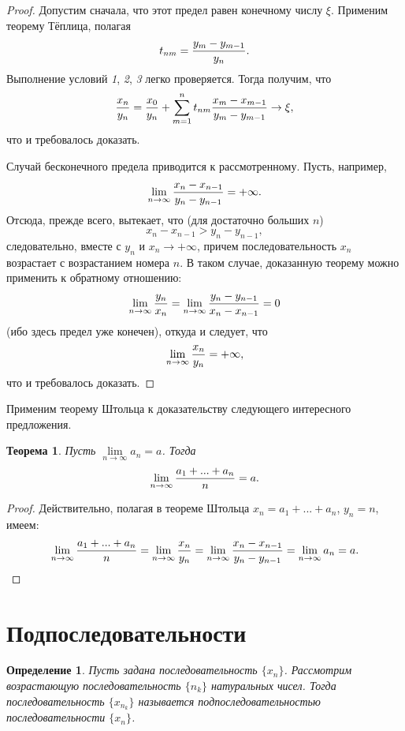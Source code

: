 \documentclass{article}
\newtheorem{theorem}{Теорема}[section]
\newtheorem{definition}{Определение}[section]
\begin{document}
\begin{proof}
Допустим сначала, что этот предел равен конечному числу \(\xi\). Применим теорему Тёплица, полагая
\[
t_{nm} = {{y_m - y_{m - 1}}\over y_n}.
\]
Выполнение условий \textit{1}, \textit{2}, \textit{3} легко проверяется. Тогда получим, что
\[
{x_n \over y_n} = {x_0 \over y_n} + \sum\limits_{m = 1}^n {t_{nm} {{x_m - x_{m - 1}} \over {y_m - y_{m - 1}}}} \to \xi,
\]
что и требовалось доказать.

Случай бесконечного предела приводится к рассмотренному. Пусть, например,
\[
\lim\limits_{n \to \infty}{{x_n - x_{n - 1}} \over {y_n - y_{n - 1}}} = + \infty.
\]
Отсюда, прежде всего, вытекает, что (для достаточно больших \(n\))
\[
x_n - x_{n - 1} > y_n - y_{n - 1},
\]
следовательно, вместе с \(y_n\) и \(x_n \to + \infty\), причем последовательность \(x_n\) возрастает с возрастанием номера \(n\). В таком случае, доказанную теорему можно применить к обратному отношению:
\[
\lim\limits_{n \to \infty}{{y_n} \over {x_n}} = \lim\limits_{n \to \infty}{{y_n - y_{n - 1}} \over {x_n - x_{n - 1}}} = 0
\]
(ибо здесь предел уже конечен), откуда и следует, что
\[
\lim\limits_{n \to \infty}{{x_n} \over {y_n}} = + \infty,
\]
что и требовалось доказать.
\end{proof}

Применим теорему Штольца к доказательству следующего интересного предложения.

\begin{theorem}
Пусть \(\lim\limits_{n \to \infty}{a_n} = a\). Тогда
\[
\lim\limits_{n \to \infty}{{a_1 + ... + a_n} \over n} = a.
\]
\end{theorem}

\begin{proof}
Действительно, полагая в теореме Штольца \(x_n = a_1 + ... + a_n\), \(y_n = n\), имеем:
\[
\lim\limits_{n \to \infty}{{a_1 + ... + a_n} \over n} = \lim\limits_{n \to \infty}{x_n \over y_n} = \lim\limits_{n \to \infty}{{x_n - x_{n - 1}} \over {y_n - y_{n - 1}}} = \lim\limits_{n \to \infty}{a_n} = a.
\]
\end{proof}

\section{Подпоследовательности}

\begin{definition}
Пусть задана последовательность \(\{x_n\}\). Рассмотрим возрастающую последовательность \(\{n_k\}\) натуральных чисел. Тогда последовательность \(\{x_{n_k}\}\) называется подпоследовательностью последовательности \(\{x_n\}\).
\end{definition}
\end{document}
